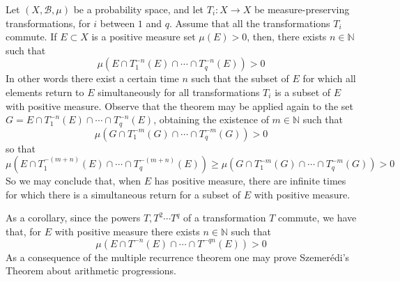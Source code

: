 \documentclass[12pt]{article}
\begin{document}
Let $(X, \mathcal{B}, \mu)$ be a probability space, and let $T_i:X \rightarrow X$ be measure-preserving transformations, for $i$ between $1$ and $q$. Assume that all the transformations $T_i$ commute. If $E\subset X$ is a positive measure set $\mu(E)>0$, then, there exists $n \in \mathbb{N}$ such that 
$$\mu (E \cap T_1^{-n}(E) \cap \cdots \cap T_q^{-n}(E))>0$$
In other words there exist a certain time $n$ such that the subset of $E$ for which all elements return to $E$ simultaneously for all transformations $T_i$ is a subset of $E$ with positive measure.
Observe that the theorem may be applied again to the set $G=E \cap T_1^{-n}(E) \cap \cdots \cap T_q^{-n}(E)$, obtaining the existence of $m\in \mathbb{N}$ such that
$$\mu (G \cap T_1^{-m}(G) \cap \cdots \cap T_q^{-m}(G))>0$$
so that $$\mu (E \cap T_1^{-(m+n)}(E) \cap \cdots \cap T_q^{-(m+n)}(E))\geq \mu (G \cap T_1^{-m}(G) \cap \cdots \cap T_q^{-m}(G)) >0$$
So we may conclude that, when $E$ has positive measure, there are infinite times for which there is a simultaneous return for a subset of $E$ with positive measure.

As a corollary, since the powers $T,T^2 \cdots T^q$ of a transformation $T$ commute, we have that, for $E$ with positive measure there exists $n \in \mathbb{N}$ such that
$$\mu (E\cap T^{-n}(E) \cap \cdots \cap T^{-qn}(E))>0$$ 
As a consequence of the multiple recurrence theorem one may prove Szemerédi's Theorem about arithmetic progressions.
\end{document}
